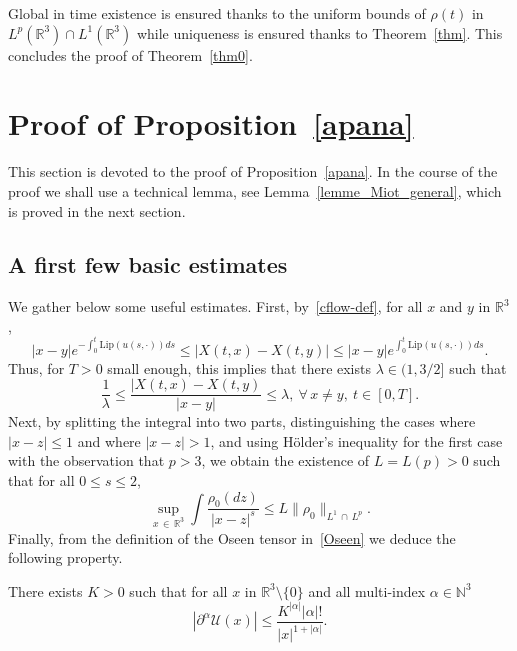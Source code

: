 \documentclass[AHL,Unicode,longabstracts,published]{cedram}
\newcommand{\Lip}{\mathrm{Lip}}
\newcommand{\R}{\mathbb{R}}
\newcommand{\N}{\mathbb{N}}
\newcommand{\clU}{\mathcal{U}}
\renewcommand{\leq}{\leqslant}
\let\oldforall\forall
\renewcommand*{\forall}{\mathrel{\oldforall}}
\begin{document}
Global in time existence is ensured thanks to the uniform bounds of $\rho(t)$ in $L^p(\R^3) \cap L^1(\R^3)$ while uniqueness is ensured thanks to Theorem~\ref{thm}. This concludes the proof of Theorem~\ref{thm0}.

\section{Proof of Proposition~\ref{apana}}\label{sec-apana}

This section is devoted to the proof of Proposition~\ref{apana}. In the course of the proof we shall use a technical lemma, see Lemma~\ref{lemme_Miot_general}, which is proved in the next section.

\subsection{A first few basic estimates} We gather below some useful estimates. First, by~\eqref{cflow-def}, for all $x$ and $y$ in $\R^3$,
\begin{equation}\label{coince}
|x-y|e^{\displaystyle -\int_0^t \Lip(u(s,\cdot))ds}\leq |X(t,x)-X(t,y)| \leq |x-y| e^{\displaystyle \int_0^t \Lip(u(s,\cdot))ds}.
\end{equation}
Thus, for $T>0$ small enough, this implies that there exists $\lambda \in (1,3/2]$ such that
\begin{equation}\label{aveclambda}
\frac{1}{\lambda} \leq \frac{|X(t,x)-X(t,y)}{|x-y|} \leq \lambda,\: \forall \, x \neq y,\: t\in[0,T].
\end{equation}
Next, by splitting the integral into two parts, distinguishing the cases where $|x-z|\leq 1$ and where $|x-z|> 1$, and using H\"older's inequality for the first case with the observation that $p>3$, we obtain the existence of $L=L(p)>0$ such that for all $0\leq s\leq 2$,
\begin{equation}\label{fors}
\underset{x\,\in\,\R^3}{\sup} \int \frac{\rho_0(dz)}{|x-z|^s} \leq L \|\rho_0\|_{L^1\,\cap\,L^p}.
\end{equation}
Finally, from the definition of the Oseen tensor in~\eqref{Oseen} we deduce the following property.

\begin{lemm}\label{lemme_oseen_rec}
There exists $K>0$ such that for all $x$ in $\R^3\setminus \{0\}$ and all multi-index $\alpha \in \N^3$
\begin{equation}\label{alpha-U}
\left|\partial^\alpha \clU(x)\right| \leq \frac{K^{|\alpha|} |\alpha|!}{|x|^{1+|\alpha|}}.
\end{equation}
\end{lemm}
\end{document}
